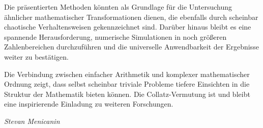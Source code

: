 \documentclass[a4paper,12pt]{article}
\begin{document}
Die präsentierten Methoden könnten als Grundlage für die Untersuchung ähnlicher mathematischer Transformationen dienen, die ebenfalls durch scheinbar chaotische Verhaltensweisen gekennzeichnet sind. Darüber hinaus bleibt es eine spannende Herausforderung, numerische Simulationen in noch größeren Zahlenbereichen durchzuführen und die universelle Anwendbarkeit der Ergebnisse weiter zu bestätigen.

Die Verbindung zwischen einfacher Arithmetik und komplexer mathematischer Ordnung zeigt, dass selbst scheinbar triviale Probleme tiefere Einsichten in die Struktur der Mathematik bieten können. Die Collatz-Vermutung ist und bleibt eine inspirierende Einladung zu weiteren Forschungen.

\vspace{1cm}
\begin{flushright}
\textit{Stevan Menicanin}
\end{flushright}
\end{document}
